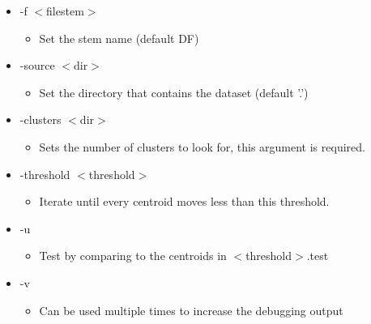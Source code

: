 \begin{itemize}
\item -f $<$filestem$>$\begin{itemize}
\item Set the stem name (default DF)\end{itemize}
\item -source $<$dir$>$\begin{itemize}
\item Set the directory that contains the dataset (default '.')\end{itemize}
\item -clusters $<$dir$>$\begin{itemize}
\item Sets the number of clusters to look for, this argument is required.\end{itemize}
\item -threshold $<$threshold$>$\begin{itemize}
\item Iterate until every centroid moves less than this threshold.\end{itemize}
\item -u\begin{itemize}
\item Test by comparing to the centroids in $<$threshold$>$.test\end{itemize}
\item -v\begin{itemize}
\item Can be used multiple times to increase the debugging output\end{itemize}
\end{itemize}


